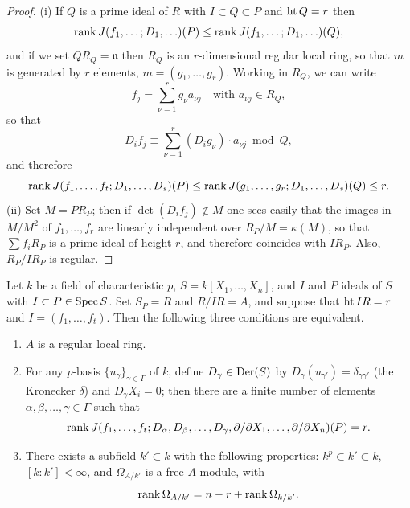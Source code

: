 \begin{proof}
(i) If $Q$ is a prime ideal of $R$ with $I \subset Q \subset P$ and $\operatorname{ht} Q = r$ then
\[
  \operatorname{rank} J(f_1, \ldots; D_1, \ldots)(P) \le \operatorname{rank} J(f_1, \ldots; D_1, \ldots)(Q),
\]
and if we set $QR_Q = \mathfrak{n}$ then $R_Q$ is an $r$-dimensional regular local ring, so
that $m$ is generated by $r$ elements, $m = (g_1, \ldots, g_r)$. Working in $R_Q$, we can
write
\[
  f_j = \sum_{\nu=1}^{r} g_\nu a_{\nu j} \quad \text{with } a_{\nu j} \in R_Q,
\]
so that
\[
  D_if_j \equiv \sum_{\nu=1}^{r} (D_ig_\nu) \cdot a_{\nu j} \bmod Q,
\]
and therefore
\[
  \operatorname{rank} J(f_1, \ldots, f_t; D_1, \ldots, D_s)(P) \le
  \operatorname{rank} J(g_1, \ldots, g_r; D_1, \ldots, D_s)(Q) \le r.
\]
(ii) Set $M = PR_P$; then if $\det(D_if_j) \notin M$ one sees easily that the images in
$M/M^2$ of $f_1, \ldots, f_r$ are linearly independent over $R_P/M = \kappa(M)$, so that
$\sum f_iR_P$ is a prime ideal of height $r$, and therefore coincides with $IR_P$.
Also, $R_P/IR_P$ is regular.
\end{proof}

\begin{theorem}\label{thm:30.5}
Let $k$ be a field of characteristic $p$, $S = k[X_1, \ldots, X_n]$, and $I$ and $P$
ideals of $S$ with $I \subset P \in \operatorname{Spec} S$. Set $S_P = R$ and $R/IR = A$, and suppose
that $\operatorname{ht} IR = r$ and $I = (f_1, \ldots, f_t)$. Then the following three conditions are
equivalent.
\begin{enumerate}[(1)]
  \item $A$ is a regular local ring.
  \item For any $p$-basis $\{u_\gamma\}_{\gamma \in \Gamma}$ of $k$, define $D_\gamma \in \operatorname{Der}(S)$ by
        $D_\gamma(u_{\gamma'}) = \delta_{\gamma\gamma'}$ (the Kronecker $\delta$) and
        $D_\gamma X_i = 0$; then there are a finite number of elements
        $\alpha, \beta, \ldots, \gamma \in \Gamma$ such that
        \[
          \operatorname{rank} J(f_1, \ldots, f_t; D_\alpha, D_\beta, \ldots, D_\gamma,
              \partial/\partial X_1, \ldots, \partial/\partial X_n)(P) = r.
        \]
  \item There exists a subfield $k' \subset k$ with the following properties:
        $k^p \subset k' \subset k$, $[k : k'] < \infty$, and $\Omega_{A/k'}$ is a free $A$-module, with
        \[
          \operatorname{rank} \Omega_{A/k'} = n - r + \operatorname{rank} \Omega_{k/k'}.
        \]
\end{enumerate}
\end{theorem}

